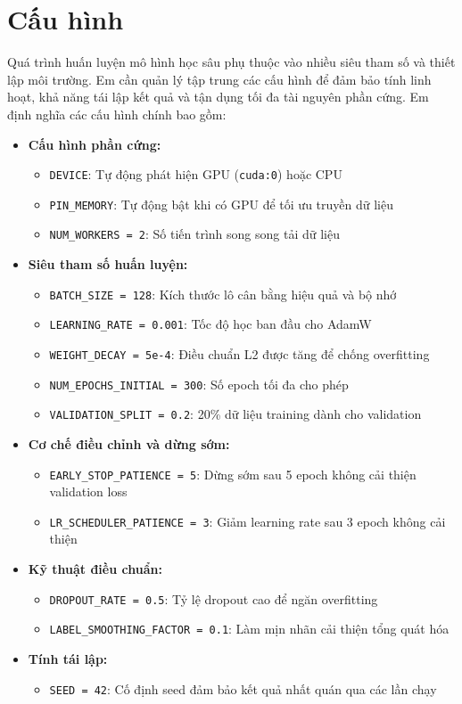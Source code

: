 \documentclass[12pt, a4paper, openany]{report}
\begin{document}
\section{Cấu hình}
Quá trình huấn luyện mô hình học sâu phụ thuộc vào nhiều siêu tham số và thiết lập môi trường. Em cần quản lý tập trung các cấu hình để đảm bảo tính linh hoạt, khả năng tái lập kết quả và tận dụng tối đa tài nguyên phần cứng. Em định nghĩa các cấu hình chính bao gồm:
\begin{itemize}
    \item \textbf{Cấu hình phần cứng:}
    \begin{itemize}
        \item \texttt{DEVICE}: Tự động phát hiện GPU (\texttt{cuda:0}) hoặc CPU
        \item \texttt{PIN\_MEMORY}: Tự động bật khi có GPU để tối ưu truyền dữ liệu
        \item \texttt{NUM\_WORKERS = 2}: Số tiến trình song song tải dữ liệu
    \end{itemize}
    \item \textbf{Siêu tham số huấn luyện:}
    \begin{itemize}
        \item \texttt{BATCH\_SIZE = 128}: Kích thước lô cân bằng hiệu quả và bộ nhớ
        \item \texttt{LEARNING\_RATE = 0.001}: Tốc độ học ban đầu cho AdamW
        \item \texttt{WEIGHT\_DECAY = 5e-4}: Điều chuẩn L2 được tăng để chống overfitting
        \item \texttt{NUM\_EPOCHS\_INITIAL = 300}: Số epoch tối đa cho phép
        \item \texttt{VALIDATION\_SPLIT = 0.2}: 20\% dữ liệu training dành cho validation
    \end{itemize}
    \item \textbf{Cơ chế điều chỉnh và dừng sớm:}
    \begin{itemize}
        \item \texttt{EARLY\_STOP\_PATIENCE = 5}: Dừng sớm sau 5 epoch không cải thiện validation loss
        \item \texttt{LR\_SCHEDULER\_PATIENCE = 3}: Giảm learning rate sau 3 epoch không cải thiện
    \end{itemize}
    \item \textbf{Kỹ thuật điều chuẩn:}
    \begin{itemize}
        \item \texttt{DROPOUT\_RATE = 0.5}: Tỷ lệ dropout cao để ngăn overfitting
        \item \texttt{LABEL\_SMOOTHING\_FACTOR = 0.1}: Làm mịn nhãn cải thiện tổng quát hóa
    \end{itemize}
    \item \textbf{Tính tái lập:}
    \begin{itemize}
        \item \texttt{SEED = 42}: Cố định seed đảm bảo kết quả nhất quán qua các lần chạy
    \end{itemize}
\end{itemize}
\end{document}
